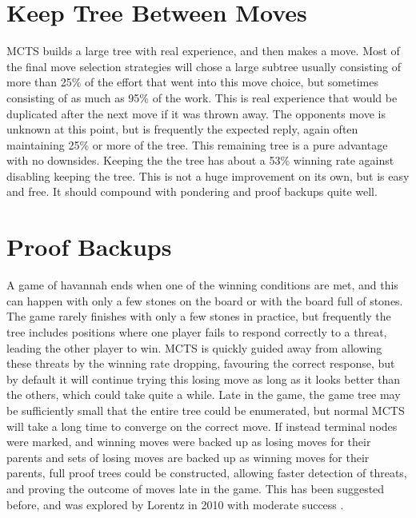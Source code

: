 \section{Keep Tree Between Moves}

MCTS builds a large tree with real experience, and then makes a move. Most of the final move selection strategies will chose a large subtree usually consisting of more than 25\% of the effort that went into this move choice, but sometimes consisting of as much as 95\% of the work. This is real experience that would be duplicated after the next move if it was thrown away. The opponents move is unknown at this point, but is frequently the expected reply, again often maintaining 25\% or more of the tree. This remaining tree is a pure advantage with no downsides. Keeping the the tree has about a 53\% winning rate against disabling keeping the tree. This is not a huge improvement on its own, but is easy and free. It should compound with pondering and proof backups quite well.



\section{Proof Backups}

A game of havannah ends when one of the winning conditions are met, and this can happen with only a few stones on the board or with the board full of stones. The game rarely finishes with only a few stones in practice, but frequently the tree includes positions where one player fails to respond correctly to a threat, leading the other player to win. MCTS is quickly guided away from allowing these threats by the winning rate dropping, favouring the correct response, but by default it will continue trying this losing move as long as it looks better than the others, which could take quite a while. Late in the game, the game tree may be sufficiently small that the entire tree could be enumerated, but normal MCTS will take a long time to converge on the correct move. If instead terminal nodes were marked, and winning moves were backed up as losing moves for their parents and sets of losing moves are backed up as winning moves for their parents, full proof trees could be constructed, allowing faster detection of threats, and proving the outcome of moves late in the game. This has been suggested before, and was explored by Lorentz in 2010 with moderate success \cite{lorentz2011improving}.

